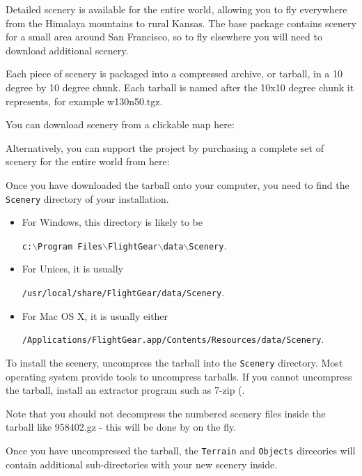 Detailed \FlightGear{} scenery is available for the entire world, allowing
you to fly everywhere from the Himalaya mountains to rural Kansas.
The \FlightGear{} base package contains scenery for a small area around San
Francisco, so to fly elsewhere you will need to download additional scenery.

Each piece of scenery is packaged into a compressed archive, or tarball, in
a 10 degree by 10 degree chunk. Each tarball is named after the 10x10 degree
chunk it represents, for example w130n50.tgz.

You can download scenery from a clickable map here:

\medskip
{}
\medskip

Alternatively, you can support the \FlightGear{} project by purchasing a complete
set of scenery for the entire world from here:

\medskip
{}
\medskip

Once you have downloaded the tarball onto your computer, you need to find the
\texttt{Scenery} directory of your \FlightGear{} installation.

\begin{itemize}
\item For Windows, this directory is likely to be

\texttt{c:$\backslash$Program Files$\backslash$FlightGear$\backslash$data$\backslash$Scenery}.
\item For Unices, it is usually

\texttt{/usr/local/share/FlightGear/data/Scenery}.
\item For Mac OS X, it is usually either

\texttt{/Applications/FlightGear.app/Contents/Resources/data/Scenery}.

\end{itemize}

To install the scenery, uncompress the tarball into the \texttt{Scenery}
directory. Most operating system provide tools to uncompress tarballs. If you cannot
uncompress the tarball, install an extractor program such as 7-zip
(.

Note that you should not decompress the numbered scenery files inside the tarball like
958402.gz - this will be done by \FlightGear{} on the fly.

Once you have uncompressed the tarball, the \texttt{Terrain} and \texttt{Objects} direcories
will contain additional sub-directories with your new scenery inside.

